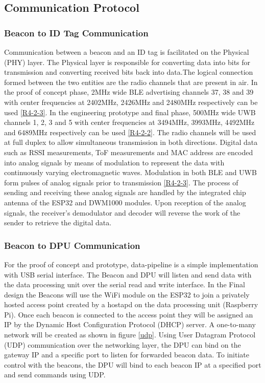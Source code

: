 \pagebreak
\subsection{Communication Protocol}
\subsubsection{Beacon to ID Tag Communication}
\medskip
Communication between a beacon and an ID tag is facilitated on the Physical (PHY) layer. The Physical layer is responsible for converting data into bits for transmission and converting received bits back into data.The logical connection formed between the two entities are the radio channels that are present in air. In the proof of concept phase, 2MHz wide BLE advertising channels 37, 38 and 39 with center frequencies at 2402MHz, 2426MHz and 2480MHz respectively can be used \ref{R4-2-3}. In the engineering prototype and final phase, 500MHz wide UWB channels 1, 2, 3 and 5 with center frequencies at 3494MHz, 3993MHz, 4492MHz and 6489MHz respectively can be used \ref{R4-2-2}. The radio channels will be used at full duplex to allow simultaneous transmission in both directions. Digital data such as RSSI measurements, ToF measurements and MAC address are encoded into analog signals by means of modulation to represent the data with continuously varying electromagnetic waves. Modulation in both BLE and UWB form pulses of analog signals prior to transmission \ref{R4-2-3}. The process of sending and receiving these analog signals are handled by the integrated chip antenna of the ESP32 and DWM1000 modules. Upon reception of the analog signals, the receiver's demodulator and decoder will reverse the work of the sender to retrieve the digital data. 
\medskip
\subsubsection{Beacon to DPU Communication}
\medskip
For the proof of concept and prototype, data-pipeline is a simple implementation with USB serial interface. The Beacon and DPU  will listen and send data with the data processing unit over the serial read and write interface. In the Final design the Beacons will use the WiFi module on the ESP32 to join a privately hosted access point created by a hostapd on the data processing unit (Raspberry Pi). Once each beacon is connected to the access point they will be assigned an IP by the Dynamic Host Configuration Protocol (DHCP) server. A one-to-many network will be created as shown in figure \ref{udp}. Using User Datagram Protocol (UDP) communication over the networking layer, the DPU can bind on the gateway IP and a specific port to listen for forwarded beacon data. To initiate control with the beacons, the DPU will bind to each beacon IP at a specified port and send commands using UDP.

